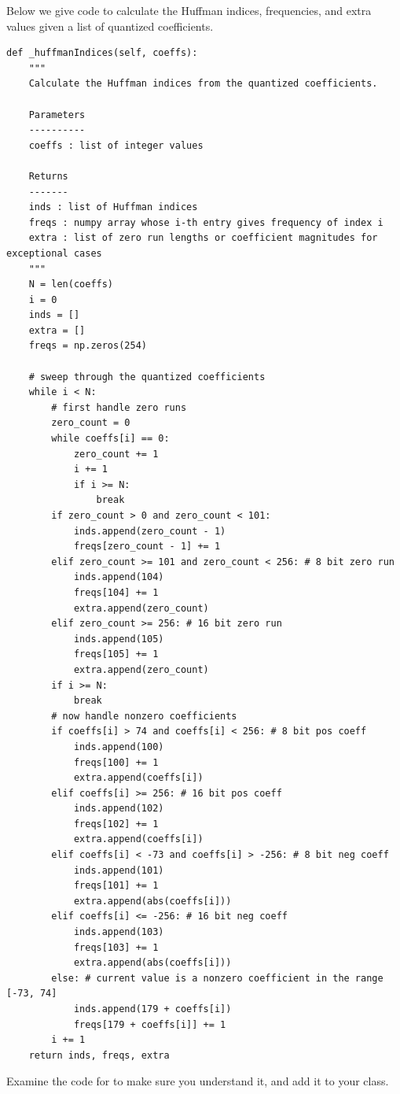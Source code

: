 Below we give code to calculate the Huffman indices, frequencies, and extra values given a list of
quantized coefficients.
\begin{lstlisting}
def _huffmanIndices(self, coeffs):
    """
    Calculate the Huffman indices from the quantized coefficients.

    Parameters
    ----------
    coeffs : list of integer values

    Returns
    -------
    inds : list of Huffman indices
    freqs : numpy array whose i-th entry gives frequency of index i
    extra : list of zero run lengths or coefficient magnitudes for exceptional cases
    """
    N = len(coeffs)
    i = 0
    inds = []
    extra = []
    freqs = np.zeros(254)

    # sweep through the quantized coefficients
    while i < N:
        # first handle zero runs
        zero_count = 0
        while coeffs[i] == 0:
            zero_count += 1
            i += 1
            if i >= N:
                break
        if zero_count > 0 and zero_count < 101:
            inds.append(zero_count - 1)
            freqs[zero_count - 1] += 1
        elif zero_count >= 101 and zero_count < 256: # 8 bit zero run
            inds.append(104)
            freqs[104] += 1
            extra.append(zero_count)
        elif zero_count >= 256: # 16 bit zero run
            inds.append(105)
            freqs[105] += 1
            extra.append(zero_count)
        if i >= N:
            break
        # now handle nonzero coefficients
        if coeffs[i] > 74 and coeffs[i] < 256: # 8 bit pos coeff
            inds.append(100)
            freqs[100] += 1
            extra.append(coeffs[i])
        elif coeffs[i] >= 256: # 16 bit pos coeff
            inds.append(102)
            freqs[102] += 1
            extra.append(coeffs[i])
        elif coeffs[i] < -73 and coeffs[i] > -256: # 8 bit neg coeff
            inds.append(101)
            freqs[101] += 1
            extra.append(abs(coeffs[i]))
        elif coeffs[i] <= -256: # 16 bit neg coeff
            inds.append(103)
            freqs[103] += 1
            extra.append(abs(coeffs[i]))
        else: # current value is a nonzero coefficient in the range [-73, 74]
            inds.append(179 + coeffs[i])
            freqs[179 + coeffs[i]] += 1
        i += 1
    return inds, freqs, extra
\end{lstlisting}
\begin{problem}
Examine the code for  to make sure you understand it, and add it to your class.
\end{problem}

